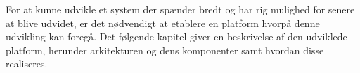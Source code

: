 For at kunne udvikle et system der spænder bredt og har rig mulighed for senere at blive udvidet, er det nødvendigt at etablere en platform hvorpå denne udvikling kan foregå.
Det følgende kapitel giver en beskrivelse af den udviklede platform, herunder arkitekturen og dens komponenter samt hvordan disse realiseres.